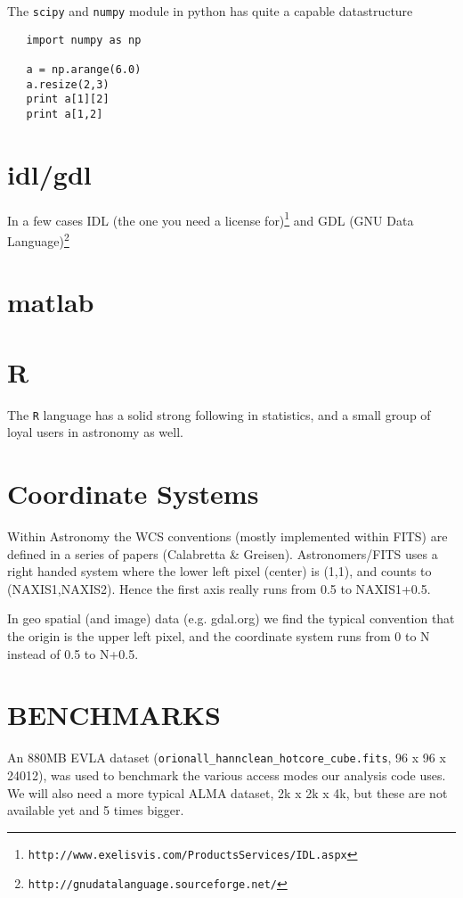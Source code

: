 \documentclass[preprint]{aastex} %
\begin{document}
The {\tt scipy} and {\tt numpy} module in python has quite a capable datastructure
\footnotesize
\begin{verbatim}
   import numpy as np

   a = np.arange(6.0)
   a.resize(2,3)
   print a[1][2]
   print a[1,2]
\end{verbatim}
\normalsize


\section{idl/gdl}

In a few cases IDL (the one you need a license for)\footnote{{\tt http://www.exelisvis.com/ProductsServices/IDL.aspx}} 
and GDL (GNU Data Language)\footnote{{\tt http://gnudatalanguage.sourceforge.net/}}

\section{matlab}

\section{R}

The {\tt R} language has a solid strong following in statistics, and a small
group of loyal users in astronomy as well.

\section{Coordinate Systems}

Within Astronomy the WCS conventions (mostly implemented within FITS) are defined
in a series of papers (Calabretta \& Greisen). Astronomers/FITS uses a right
handed system where the lower left pixel (center) is (1,1), and counts
to (NAXIS1,NAXIS2). Hence the first axis really runs from 0.5 to NAXIS1+0.5.

In geo spatial (and image) data (e.g. gdal.org) we find the typical convention
that the origin is the upper left pixel, and the coordinate system runs from
0 to N instead of 0.5 to N+0.5.

\section{BENCHMARKS}

An 880MB EVLA dataset 
({\tt orionall\_hannclean\_hotcore\_cube.fits}, 96 x 96 x 24012),
was used to benchmark the various access modes our analysis code uses.
We will also need a more typical ALMA dataset, 2k x 2k x 4k, but these
are not available yet and 5 times bigger.
\end{document}
